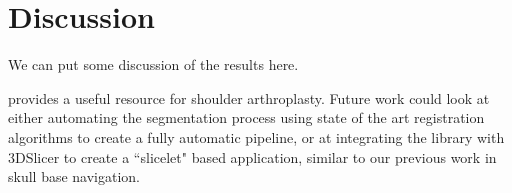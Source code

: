 \section{Discussion}
\label{sec:discussion}
We can put some discussion of the results here.

\sksglenoid provides a useful resource for shoulder arthroplasty. Future work could look at either 
automating the segmentation process using state of the art registration algorithms \cite{Fu2020} to create a fully automatic pipeline, or at integrating the library with 3DSlicer to create a 
``slicelet" based application, similar to our previous work \cite{PMID:33937966} in skull base 
navigation.

